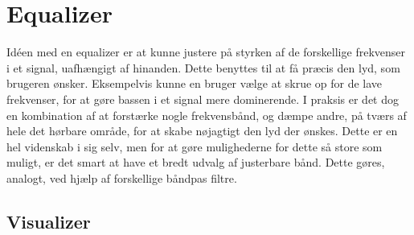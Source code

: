 \section{Equalizer}
\label{equalizer}
Idéen med en equalizer er at kunne justere på styrken af de forskellige frekvenser i et signal, uafhængigt af hinanden. Dette benyttes til at få præcis den lyd, som brugeren ønsker. Eksempelvis kunne en bruger vælge at skrue op for de lave frekvenser, for at gøre bassen i et signal mere dominerende. I praksis er det dog en kombination af at forstærke nogle frekvensbånd, og dæmpe andre, på tværs af hele det hørbare område, for at skabe nøjagtigt den lyd der ønskes. Dette er en hel videnskab i sig selv, men for at gøre mulighederne for dette så store som muligt, er det smart at have et bredt udvalg af justerbare bånd. Dette gøres, analogt, ved hjælp af forskellige båndpas filtre.

\subsection{Visualizer}